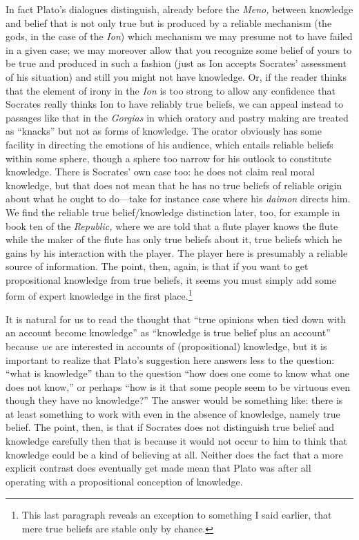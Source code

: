 \documentclass[11pt]{amsart}
\begin{document}
In fact Plato's dialogues distinguish, already before the \emph{Meno,}
between knowledge and belief that is not only true but is produced by
a reliable mechanism (the gods, in the case of the \emph{Ion}) which
mechanism we may presume not to have failed in a given case; we may
moreover allow that you recognize some belief of yours to be true and
produced in such a fashion (just as Ion accepts Socrates' assessment
of his situation) and still you might not have knowledge. Or, if the
reader thinks that the element of irony in the \emph{Ion} is too
strong to allow any confidence that Socrates really thinks Ion to have
reliably true beliefs, we can appeal instead to passages like that in
the \emph{Gorgias} in which oratory and pastry making are treated as
``knacks'' but not as forms of knowledge. The orator obviously has
some facility in directing the emotions of his audience, which entails
reliable beliefs within some sphere, though a sphere too narrow for
his outlook to constitute knowledge. There is Socrates' own case too:
he does not claim real moral knowledge, but that does not mean that he
has no true beliefs of reliable origin about what he ought to
do---take for instance case where his \emph{daimon} directs him. We
find the reliable true belief/knowledge distinction later, too, for
example in book ten of the \emph{Republic,} where we are told that a
flute player knows the flute while the maker of the flute has only
true beliefs about it, true beliefs which he gains by his interaction
with the player. The player here is presumably a reliable source of
information. The point, then, again, is that if you want to get
propositional knowledge from true beliefs, it seems you must simply
add some form of expert knowledge in the first place.\footnote{This
last paragraph reveals an exception to something I said earlier, that
mere true beliefs are stable only by chance.}



It is natural for us to read the thought that ``true opinions when
tied down with an account become knowledge'' as ``knowledge is true
belief plus an account'' because \emph{we} are interested in accounts
of (propositional) knowledge, but it is important to realize that
Plato's suggestion here answers less to the question: ``what is
knowledge'' than to the question ``how does one come to know what one
does not know,'' or perhaps ``how is it that some people seem to be
virtuous even though they have no knowledge?'' The answer would be
something like: there is at least something to work with even in the
absence of knowledge, namely true belief. The point, then, is that if
Socrates does not distinguish true belief and knowledge carefully then
that is because it would not occur to him to think that knowledge
could be a kind of believing at all. Neither does the fact that a more
explicit contrast does eventually get made mean that Plato was after
all operating with a propositional conception of knowledge.
\end{document}
